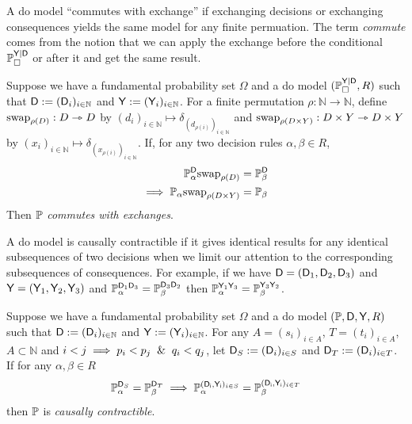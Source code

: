A do model ``commutes with exchange'' if exchanging decisions or exchanging consequences yields the same model for any finite permuation. The term \emph{commute} comes from the notion that we can apply the exchange before the conditional $\mathbb{P}_{\square}^{\mathsf{Y}|\mathsf{D}}$ or after it and get the same result.

\begin{definition}\label{def:caus_exch}
Suppose we have a fundamental probability set $\Omega$ and a do model $(\mathbb{P}_{\square}^{\mathsf{Y}|\mathsf{D}},R)$ such that $\mathsf{D}:=(\mathsf{D}_i)_{i\in \mathbb{N}}$ and $\mathsf{Y}:=(\mathsf{Y}_i)_{i\in\mathbb{N}}$. For a finite permutation $\rho:\mathbb{N}\to\mathbb{N}$, define $\text{swap}_{\rho(D)}:D\rightarrowtriangle D$ by $(d_i)_{i\in\mathbb{N}}\mapsto \delta_{(d_{\rho(i)})_{i\in\mathbb{N}}}$ and $\text{swap}_{\rho(D\times Y)}:D\times Y\rightarrowtriangle D\times Y$ by $(x_i)_{i\in\mathbb{N}}\mapsto \delta_{(x_{\rho(i)})_{i\in\mathbb{N}}}$. If, for any two decision rules $\alpha,\beta \in R$,
\begin{align}
    \mathbb{P}_\alpha^{\mathsf{D}}\text{swap}_{\rho(D)} &= \mathbb{P}_{\beta}^{\mathsf{D}}\\
    \implies  \mathbb{P}_\alpha\text{swap}_{\rho(D\times Y)}&=\mathbb{P}_\beta
\end{align}
Then $\mathbb{P}$ \emph{commutes with exchanges}.
\end{definition}

A do model is causally contractible if it gives identical results for any identical subsequences of two decisions when we limit our attention to the corresponding subsequences of consequences. For example, if we have $\mathsf{D}=(\mathsf{D}_1,\mathsf{D}_2,\mathsf{D}_3)$ and $\mathsf{Y}=(\mathsf{Y}_1,\mathsf{Y}_2,\mathsf{Y}_3)$ and $\mathbb{P}_\alpha^{\mathsf{D}_1\mathsf{D}_3}=\mathbb{P}_\beta^{\mathsf{D}_3\mathsf{D}_2}$ then $\mathbb{P}_{\alpha}^{\mathsf{Y}_1\mathsf{Y}_3}=\mathbb{P}_\beta^{\mathsf{Y}_3\mathsf{Y}_2}$.

\begin{definition}\label{def:caus_cont}
Suppose we have a fundamental probability set $\Omega$ and a do model $(\mathbb{P},\mathsf{D},\mathsf{Y},R)$ such that $\mathsf{D}:=(\mathsf{D}_i)_{i\in \mathbb{N}}$ and $\mathsf{Y}:=(\mathsf{Y}_i)_{i\in\mathbb{N}}$. For any $A=(s_i)_{i\in A}$, $T=(t_i)_{i\in A}$, $A\subset\mathbb{N}$ and $i<j\implies p_i<p_j \And q_i<q_j$, let $\mathsf{D}_S:=(\mathsf{D}_i)_{i\in S}$ and $\mathsf{D}_T:=(\mathsf{D}_i)_{i\in T}$. If for any $\alpha,\beta\in R$
\begin{align}
    \mathbb{P}_\alpha^{\mathsf{D}_{S}}=\mathbb{P}_\beta^{\mathsf{D}_{T}}\implies \mathbb{P}_\alpha^{(\mathsf{D_i,Y_i})_{i\in S}}=\mathbb{P}_\beta^{(\mathsf{D_i,Y_i})_{i\in T}}
\end{align}
then $\mathbb{P}$ is \emph{causally contractible}.
\end{definition}

